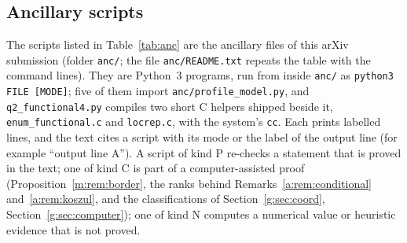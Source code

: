 \documentclass[11pt]{article}
\theoremstyle{definition}
\theoremstyle{remark}
\begin{document}
\subsection{Ancillary scripts}\label{a:sec:anc}

The scripts listed in Table~\ref{tab:anc} are the ancillary files of this arXiv submission (folder \texttt{anc/}; the file \texttt{anc/README.txt} repeats the table with the command lines). They are Python~3 programs, run from inside \texttt{anc/} as \texttt{python3 FILE [MODE]}; five of them import \texttt{anc/profile\_model.py}, and \texttt{q2\_functional4.py} compiles two short C helpers shipped beside it, \texttt{enum\_functional.c} and \texttt{locrep.c}, with the system's \texttt{cc}. Each prints labelled lines, and the text cites a script with its mode or the label of the output line (for example ``output line A''). A script of kind P re-checks a statement that is proved in the text; one of kind C is part of a computer-assisted proof (Proposition~\ref{m:rem:border}, the ranks behind Remarks~\ref{a:rem:conditional} and~\ref{a:rem:koszul}, and the classifications of Section~\ref{g:sec:coord}, Section~\ref{g:sec:computer}); one of kind N computes a numerical value or heuristic evidence that is not proved.
\end{document}
